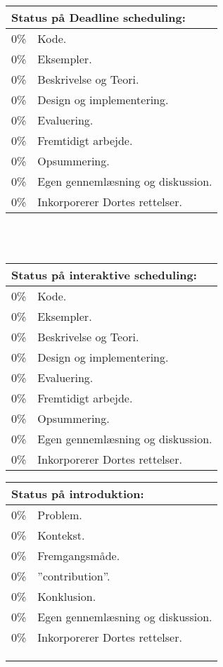 \begin{tabular}{m{0.5cm}m{5cm}}
\hline  
\multicolumn{2}{m{4.5cm}}{\textbf{Status på Deadline scheduling:}} \\
\hline
0\% & Kode.  \\ 
0\% & Eksempler.\\
0\% & Beskrivelse og Teori.\\
0\% & Design og  implementering. \\
0\% & Evaluering. \\
0\% & Fremtidigt arbejde. \\
0\% & Opsummering. \\ 
0\% & Egen gennemlæsning og diskussion. \\ 
0\% & Inkorporerer Dortes rettelser. \\ 
\hline
\end{tabular}\\\vspace{1cm}\\
\begin{tabular}{m{0.5cm}m{5cm}}
\hline  
\multicolumn{2}{m{4.5cm}}{\textbf{Status på interaktive scheduling:}} \\
\hline
0\% & Kode.  \\ 
0\% & Eksempler.\\
0\% & Beskrivelse og Teori.\\
0\% & Design og  implementering. \\
0\% & Evaluering. \\
0\% & Fremtidigt arbejde. \\
0\% & Opsummering. \\ 
0\% & Egen gennemlæsning og diskussion. \\ 
0\% & Inkorporerer Dortes rettelser. \\ 
\hline
\end{tabular}
\quad
\begin{tabular}{m{0.5cm}m{5cm}}
\hline  
\multicolumn{2}{m{4.5cm}}{\textbf{Status på introduktion:}} \\
\hline
0\% & Problem.  \\ 
0\% & Kontekst.\\
0\% & Fremgangsmåde.\\
0\% & ''contribution''. \\
0\% & Konklusion. \\
0\% & Egen gennemlæsning og diskussion. \\ 
0\% & Inkorporerer Dortes rettelser. \\ 
\hline
&\\
&\\
&\\
\end{tabular}

